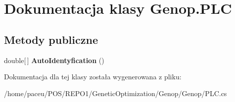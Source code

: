 \hypertarget{classGenop_1_1PLC}{}\section{Dokumentacja klasy Genop.\+P\+LC}
\label{classGenop_1_1PLC}
\subsection*{Metody publiczne}
\begin{DoxyCompactItemize}
\item 
double\mbox{[}$\,$\mbox{]} {\bfseries Auto\+Identyfication} ()\hypertarget{classGenop_1_1PLC_afa849d2eba7ea7ba9f2c36364e069c45}{}\label{classGenop_1_1PLC_afa849d2eba7ea7ba9f2c36364e069c45}

\end{DoxyCompactItemize}


Dokumentacja dla tej klasy została wygenerowana z pliku\+:\begin{DoxyCompactItemize}
\item 
/home/paceu/\+P\+O\+S/\+R\+E\+P\+O1/\+Genetic\+Optimization/\+Genop/\+Genop/P\+L\+C.\+cs\end{DoxyCompactItemize}

